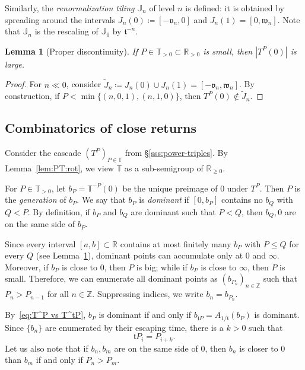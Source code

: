 \documentclass{amsart}
\newcommand{\1}{{\mathbb 1 }}
\newcommand\PT{\mathbb{ T}}
\newcommand{\vv}{\mathfrak{v}}
\newcommand{\ww}{\mathfrak{w}}
\renewcommand{\tt}{\mathfrak{t}}
\newcommand{\R}{\mathbb{R}}
\newcommand{\Z}{\mathbb{Z}}
\newcommand{\T}{\mathbb{T}}
\newtheorem{lem}[thm]{Lemma}
\theoremstyle{remark}
\numberwithin{equation}{section}
\theoremstyle{definition}
\theoremstyle{nonumberbreak}
\begin{document}
   
 
 Similarly, the \emph{renormalization tiling} $\mathbb J_n$ of level $n$ is defined: it is obtained by spreading around the intervals $J_{n}(0)\coloneqq [-\vv_n,0]$ and $ J_{n}(1)=[0,\ww_n]$. Note that $\mathbb J_n$ is the rescaling of $\mathbb J_0$ by $\tt^{-n}$.
 
\begin{lem}[Proper discontinuity]
\label{lem:transl:prop disc}
If $P\in \PT_{>0}\subset \R_{>0}$ is small, then $|T^P(0)|$ is large. 
\end{lem} 
\begin{proof}
For $n\ll0$, consider $\widetilde J_n\coloneqq J_{n}(0)\cup J_{n}(1)=[-\vv_n,\ww_n]$. By construction, if $P < \min \{(n,0,1),(n,1,0)\}$, then $T^P(0)\not\in \widetilde J_n$.
\end{proof}
 
 
\subsection{Combinatorics of close returns}
\label{ss:closed returns}
Consider the cascade $(T^P)_{P\in \PT}$ from \S\ref{sss:power-triples}. By Lemma~\ref{lem:PT:rot}, we view $\PT$ as a sub-semigroup of $\R_{\ge0}$.

For $P\in \PT_{>0}$, let $b_P=\T^{-P}(0)$ be the unique preimage of $0$ under $T^P$. Then $P$ is the \emph{generation} of $b_P$. We say that $b_P$ is \emph{dominant} if $[0,b_P]$ contains no $b_Q$ with $Q<P$. By definition, if $b_P$ and $b_Q$ are dominant such that $P<Q$, then $b_Q,0$ are on the same side of $b_P$. 


Since every interval $[a,b]\subset \R$ contains at most finitely many $b_P$ with $P\le Q$ for every $Q$ (see Lemma~\ref{lem:transl:prop disc}), dominant points can accumulate only at $0$ and $\infty$. Moreover, if $b_P$ is close to $0$, then $P$ is big; while if $b_P$ is close to $\infty$, then $P$ is small. Therefore, we can enumerate all dominant points as $(b_{P_n})_{n\in \Z}$ such that $P_n>P_{n-1}$ for all $n\in \Z$. Suppressing indices, we write $b_n=b_{P_n}$.



By~\eqref{eq:T^P vs T^tP}, $b_P$ is dominant if and only if $b_{\tt P}=A_{1/\tt} (b_P)$ is dominant. Since $\{b_n\}$ are enumerated by their escaping time, there is a $k>0$ such that \[\tt P_i=P_{i+k}.\]
Let us also note that if $b_n,b_m$ are on the same side of $0$, then $b_n$ is closer to $0$ than $b_m$ if and only if $P_n>P_m$.
\end{document}
